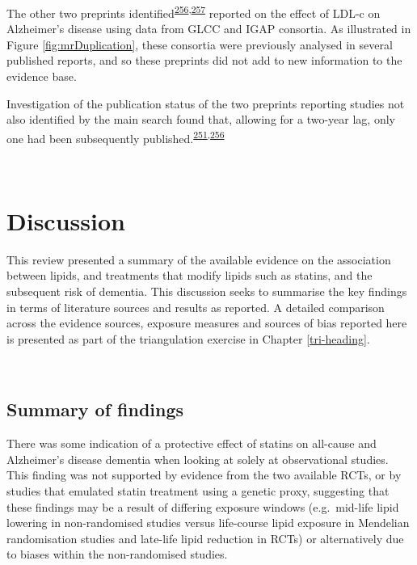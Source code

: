 \documentclass[a4paper, twoside]{templates/ociamthesis}
\begin{document}
The other two preprints identified\textsuperscript{\protect\hyperlink{ref-andrews2019}{256},\protect\hyperlink{ref-zhu2017}{257}} reported on the effect of LDL-c on Alzheimer's disease using data from GLCC and IGAP consortia. As illustrated in Figure \ref{fig:mrDuplication}, these consortia were previously analysed in several published reports, and so these preprints did not add to new information to the evidence base.

Investigation of the publication status of the two preprints reporting studies not also identified by the main search found that, allowing for a two-year lag, only one had been subsequently published.\textsuperscript{\protect\hyperlink{ref-andrews2021}{251},\protect\hyperlink{ref-andrews2019}{256}}

~

\hypertarget{discussion-1}{%
\section{Discussion}\label{discussion-1}}

This review presented a summary of the available evidence on the association between lipids, and treatments that modify lipids such as statins, and the subsequent risk of dementia. This discussion seeks to summarise the key findings in terms of literature sources and results as reported. A detailed comparison across the evidence sources, exposure measures and sources of bias reported here is presented as part of the triangulation exercise in Chapter \ref{tri-heading}.

~

\hypertarget{summary-of-findings}{%
\subsection{Summary of findings}\label{summary-of-findings}}

There was some indication of a protective effect of statins on all-cause and Alzheimer's disease dementia when looking at solely at observational studies. This finding was not supported by evidence from the two available RCTs, or by studies that emulated statin treatment using a genetic proxy, suggesting that these findings may be a result of differing exposure windows (e.g.~mid-life lipid lowering in non-randomised studies versus life-course lipid exposure in Mendelian randomisation studies and late-life lipid reduction in RCTs) or alternatively due to biases within the non-randomised studies.
\end{document}
